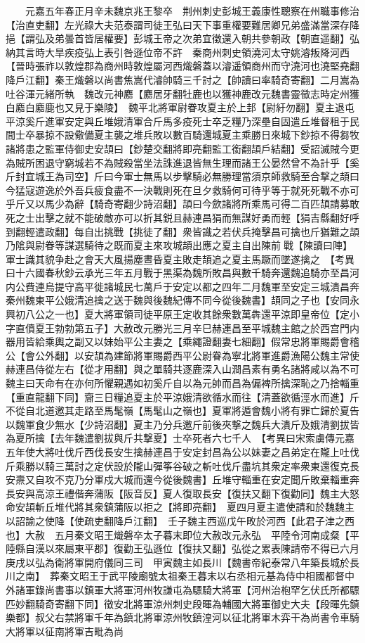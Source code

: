 　　元嘉五年春正月辛未魏京兆王黎卒　荆州刺史彭城王義康性聰察在州職事修治【治直吏翻】左光祿大夫范泰謂司徒王弘曰天下事重權要難居卿兄弟盛滿當深存降挹【謂弘及弟曇首皆居權要】彭城王帝之次弟宜徵還入朝共參朝政【朝直遥翻】弘納其言時大旱疾疫弘上表引咎遜位帝不許　秦商州刺史領澆河太守姚濬叛降河西【晉時張祚以敦煌郡為商州時敦煌屬河西熾磐蓋以濬遥領商州而守澆河也澆堅堯翻降戶江翻】秦王熾磐以尚書焦嵩代濬帥騎三千討之【帥讀曰率騎奇寄翻】二月嵩為吐谷渾元緒所執　魏改元神䴥【䴥居牙翻牡鹿也以獲神鹿改元魏書靈徵志時定州獲白䴥白䴥鹿也又見于樂陵】　魏平北將軍尉眷攻夏主於上邽【尉紆勿翻】夏主退屯平涼奚斤進軍安定與丘堆娥清軍合斤馬多疫死士卒乏糧乃深壘自固遣丘堆督租于民間士卒暴掠不設儆備夏主襲之堆兵敗以數百騎還城夏主乘勝日來城下鈔掠不得芻牧諸將患之監軍侍御史安頡曰【鈔楚交翻將即亮翻監工銜翻頡戶結翻】受詔滅賊今更為賊所困退守窮城若不為賊殺當坐法誅進退皆無生理而諸王公晏然曾不為計乎【奚斤封宜城王為司空】斤曰今軍士無馬以步擊騎必無勝理當須京師救騎至合撃之頡曰今猛寇遊逸於外吾兵疲食盡不一決戰則死在旦夕救騎何可待乎等于就死死戰不亦可乎斤又以馬少為辭【騎奇寄翻少詩沼翻】頡曰今歛諸將所乘馬可得二百匹頡請募敢死之士出擊之就不能破敵亦可以折其鋭且赫連昌狷而無謀好勇而輕【狷吉縣翻好呼到翻輕遣政翻】每自出挑戰【挑徒了翻】衆皆識之若伏兵掩擊昌可擒也斤猶難之頡乃隂與尉眷等謀選騎待之既而夏主來攻城頡出應之夏主自出陳前戰【陳讀曰陣】軍士識其貌争赴之會天大風揚塵晝昏夏主敗走頡追之夏主馬蹶而墜遂擒之　【考異曰十六國春秋鈔云承光三年五月戰于黑渠為魏所敗昌與數千騎奔還魏追騎亦至昌河内公費連烏提守高平徙諸城民七萬戶于安定以都之四年二月魏軍至安定三城潰昌奔秦州魏東平公娥清追擒之送于魏與後魏紀傳不同今從後魏書】頡同之子也【安同永興初八公之一也】夏大將軍領司徒平原王定收其餘衆數萬犇還平涼即皇帝位【定小字直僨夏王勃勃第五子】大赦改元勝光三月辛巳赫連昌至平城魏主館之於西宫門内器用皆給乘輿之副又以妹始平公主妻之【乘繩證翻妻七細翻】假常忠將軍賜爵會稽公【會公外翻】以安頡為建節將軍賜爵西平公尉眷為寧北將軍進爵漁陽公魏主常使赫連昌侍從左右【從才用翻】與之單騎共逐鹿深入山澗昌素有勇名諸將咸以為不可魏主曰天命有在亦何所懼親遇如初奚斤自以為元帥而昌為偏裨所擒深恥之乃捨輜重【重直龍翻下同】齎三日糧追夏主於平涼娥清欲循水而往【清蓋欲循涇水而進】斤不從自北道邀其走路至馬髦嶺【馬髦山之嶺也】夏軍將遁會魏小將有罪亡歸於夏告以魏軍食少無水【少詩沼翻】夏主乃分兵邀斤前後夾撃之魏兵大潰斤及娥清劉拔皆為夏所擒【去年魏遣劉拔與斤共撃夏】士卒死者六七千人　【考異曰宋索虜傳元嘉五年使大將吐伐斤西伐長安生擒赫連昌于安定封昌為公以妹妻之昌弟定在隴上吐伐斤乘勝以騎三萬討之定伏設於隴山彈筝谷破之斬吐伐斤盡坑其衆定率衆東還復克長安燾又自攻不克乃分軍戍大城而還今從後魏書】丘堆守輜重在安定聞斤敗棄輜重奔長安與高涼王禮偕奔蒲阪【阪音反】夏人復取長安【復扶又翻下復勸同】魏主大怒命安頡斬丘堆代將其衆鎮蒲阪以拒之【將即亮翻】　夏四月夏主遣使請和於魏魏主以詔諭之使降【使疏吏翻降戶江翻】　壬子魏主西巡戊午畋於河西【此君子津之西也】大赦　五月秦文昭王熾磐卒太子暮末即位大赦改元永弘　平陸令河南成粲【平陸縣自漢以來屬東平郡】復勸王弘遜位【復扶又翻】弘從之累表陳請帝不得已六月庚戌以弘為衛將軍開府儀同三司　甲寅魏主如長川【魏書帝紀泰常八年築長城於長川之南】　葬秦文昭王于武平陵廟號太祖秦王暮末以右丞相元基為侍中相國都督中外諸軍錄尚書事以鎮軍大將軍河州牧謙屯為驃騎大將軍【河州治枹罕乞伏氏所都驃匹妙翻騎奇寄翻下同】徵安北將軍涼州刺史段暉為輔國大將軍御史大夫【段暉先鎮樂都】叔父右禁將軍千年為鎮北將軍涼州牧鎮湟河以征北將軍木弈干為尚書令車騎大將軍以征南將軍吉毗為尚